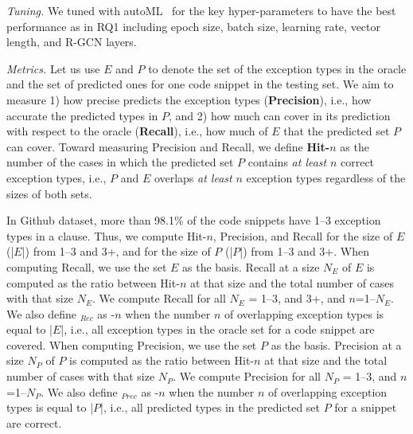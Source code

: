 {\em Tuning.} We tuned {\tool} with autoML~\cite{NNI} for the
key hyper-parameters to have the best performance as in RQ1 including
epoch size, batch size, learning rate, vector length, and R-GCN layers.

{\em Metrics.} Let us use $E$ and $P$ to denote the set of the
exception types in the oracle and the set of predicted
ones for one code snippet in the testing set. We aim to measure 1) how
precise {\tool} predicts the exception types ({\bf Precision}), i.e.,
how accurate the predicted types in $P$, and 2) how much {\tool} can
cover in its prediction with respect to the oracle ({\bf Recall}),
i.e., how much of $E$ that the predicted set $P$ can cover. Toward
measuring Precision and Recall, we define {\bf Hit-$n$} as the number
of the cases in which the predicted set $P$ contains
{\em at least} $n$ correct exception types, i.e., $P$ and $E$ overlaps
{\em at least} $n$ exception types regardless of the sizes of both
sets.

In Github dataset, more than 98.1\% of the code snippets have 1--3
exception types in a  clause. Thus, we compute Hit-$n$,
Precision, and Recall for the size of $E$ (|$E$|) from 1--3 and 3+,
and for the size of $P$ (|$P$|) from 1--3 and 3+.
%
When computing Recall, we use the set $E$ as the basis. Recall at a
size $N_E$ of $E$ is computed as the ratio between Hit-$n$ at that
size and the total number of cases with that size $N_E$. We compute
Recall for all $N_E$ = 1--3, and 3+, and $n$=1--$N_E$. We also define
{\bf {}$_{Rec}$} as -$n$ when the number $n$ of
overlapping exception types is equal to |$E$|, i.e., all exception
types in the oracle set for a code snippet are covered.
%
When computing Precision, we use the set $P$ as the basis. Precision
at a size $N_P$ of $P$ is computed as the ratio between Hit-$n$ at
that size and the total number of cases with that size $N_P$. We
compute Precision for all $N_P$ = 1--3, and $n$=1--$N_P$. We also
define {\bf {}$_{Prec}$} as -$n$ when the number $n$
of overlapping exception types is equal to |$P$|, i.e., all predicted
types in the predicted set $P$ for a snippet are
correct.



